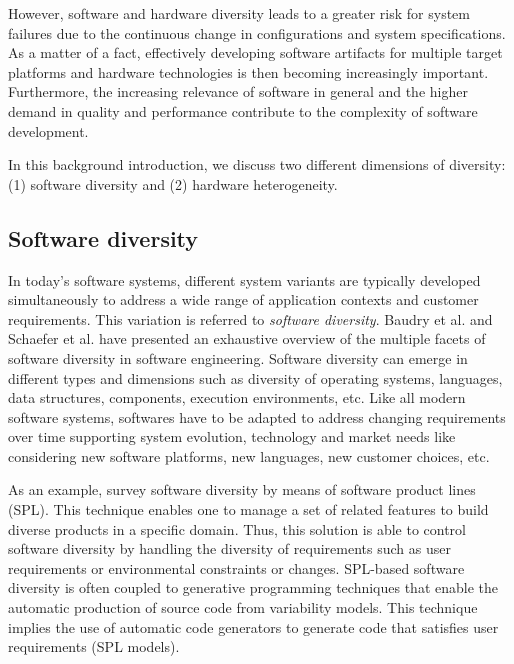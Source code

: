 However, software and hardware diversity leads to a greater risk for system failures due to the continuous change in configurations and system specifications.
As a matter of a fact, effectively developing software artifacts for multiple target platforms and hardware technologies is then becoming increasingly important.
Furthermore, the increasing relevance of software in general and the higher demand in quality and performance contribute to the complexity of software development.

In this background introduction, we discuss two different dimensions of diversity: (1) software diversity and (2) hardware heterogeneity.

 
 
\subsection{Software diversity}
In today's software systems, different system variants are typically developed simultaneously to address a wide range of application contexts and customer requirements\cite{schaefer2012software}. 
This variation is referred to \textit{software diversity}. 
Baudry et al.\cite{baudry2015multiple} and Schaefer et al.\cite{schaefer2012software} have presented an exhaustive overview of the multiple facets of software diversity in software engineering. 
Software diversity can emerge in different types and dimensions such as diversity of operating systems, languages, data structures, components, execution environments, etc. 
Like all modern software systems, softwares have to be adapted to address changing requirements over time supporting system evolution, technology and market needs like considering new software platforms, new languages, new customer choices, etc.

As an example, \cite{schaefer2012software} survey software diversity by means of software product lines (SPL). This technique enables one to manage a set of related features to build diverse products in a specific domain. Thus, this solution is able to control software diversity by handling the diversity of requirements such as user requirements or environmental constraints or changes. SPL-based software diversity is often coupled to generative programming techniques\cite{Czarnecki:2000:GPM:345203} that enable the automatic production of source code from variability models. This technique implies the use of automatic code generators to generate code that satisfies user requirements (SPL models).

